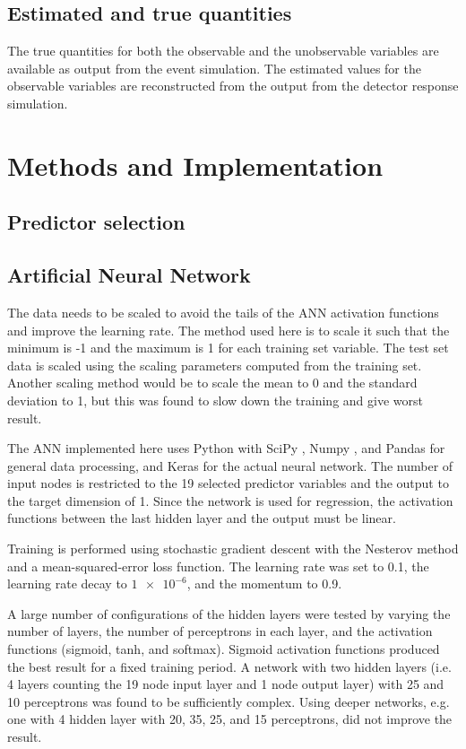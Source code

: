 \documentclass{scrartcl}
\begin{document}
\subsection{Estimated and true quantities}
The true quantities for both the observable and the unobservable variables are available as output from the event simulation. The estimated values for the observable variables are reconstructed from the output from the detector response simulation.

\section{Methods and Implementation}

\subsection{Predictor selection}

\subsection{Artificial Neural Network}

The data needs to be scaled to avoid the tails of the \gls{ANN} activation functions and improve the learning rate. The method used here is to scale it such that the minimum is -1 and the maximum is 1 for each training set variable. The test set data is scaled using the scaling parameters computed from the training set. Another scaling method would be to scale the mean to 0 and the standard deviation to 1, but this was found to slow down the training and give worst result.

The \gls{ANN} implemented here uses Python with SciPy \cite{scipy}, Numpy \cite{numpy}, and Pandas \cite{pandas} for general data processing, and Keras \cite{keras} for the actual neural network. The number of input nodes is restricted to the 19 selected predictor variables and the output to the target dimension of 1. Since the network is used for regression, the activation functions between the last hidden layer and the output must be linear.

Training is performed using stochastic gradient descent with the Nesterov method \cite{nesterov} and a mean-squared-error loss function. The learning rate was set to 0.1, the learning rate decay to $\num{1e-6}$, and the momentum to 0.9.

A large number of configurations of the hidden layers were tested by varying the number of layers, the number of perceptrons in each layer, and the activation functions (sigmoid, tanh, and softmax). Sigmoid activation functions produced the best result for a fixed training period. A network with two hidden layers (i.e. 4 layers counting the 19 node input layer and 1 node output layer) with 25 and 10 perceptrons was found to be sufficiently complex. Using deeper networks, e.g. one with 4 hidden layer with 20, 35, 25, and 15 perceptrons, did not improve the result.
\end{document}
